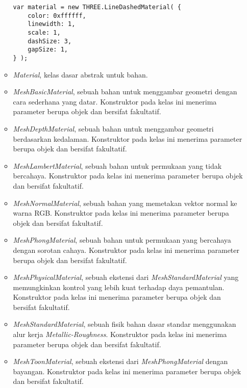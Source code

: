 \begin{itemize}
\begin{itemize}
\begin{lstlisting}[caption={Contoh penggunaan kelas {\it LineDashMaterial}.},captionpos=b]
var material = new THREE.LineDashedMaterial( {
	color: 0xffffff,
	linewidth: 1,
	scale: 1,
	dashSize: 3,
	gapSize: 1,
} );
\end{lstlisting}

	\item {\it Material}, kelas dasar abstrak untuk bahan.
	
	\item {\it MeshBasicMaterial}, sebuah bahan untuk menggambar geometri dengan cara sederhana yang datar. Konstruktor pada kelas ini menerima parameter berupa objek dan bersifat fakultatif.
	
	\item {\it MeshDepthMaterial}, sebuah bahan untuk menggambar geometri berdasarkan kedalaman. Konstruktor pada kelas ini menerima parameter berupa objek dan bersifat fakultatif.
	
	\item {\it MeshLambertMaterial}, sebuah bahan untuk permukaan yang tidak bercahaya. Konstruktor pada kelas ini menerima parameter berupa objek dan bersifat fakultatif.
	
	\item {\it MeshNormalMaterial}, sebuah bahan yang memetakan vektor normal ke warna RGB. Konstruktor pada kelas ini menerima parameter berupa objek dan bersifat fakultatif.
	
	\item {\it MeshPhongMaterial}, sebuah bahan untuk permukaan yang bercahaya dengan sorotan cahaya. Konstruktor pada kelas ini menerima parameter berupa objek dan bersifat fakultatif.
	
	\item {\it MeshPhysicalMaterial}, sebuah ekstensi dari {\it MeshStandardMaterial} yang memungkinkan kontrol yang lebih kuat terhadap daya pemantulan. Konstruktor pada kelas ini menerima parameter berupa objek dan bersifat fakultatif.
	
	\item {\it MeshStandardMaterial}, sebuah fisik bahan dasar standar menggunakan alur kerja {\it Metallic-Roughness}. Konstruktor pada kelas ini menerima parameter berupa objek dan bersifat fakultatif.
	
	\item {\it MeshToonMaterial}, sebuah ekstensi dari {\it MeshPhongMaterial} dengan bayangan. Konstruktor pada kelas ini menerima parameter berupa objek dan bersifat fakultatif.
	

\end{itemize}
\end{itemize}

